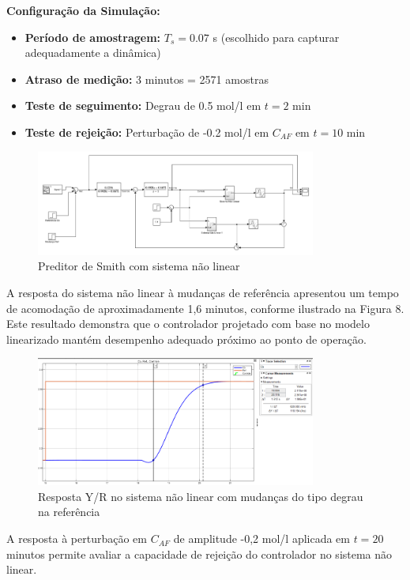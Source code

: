 \documentclass[a4paper,12pt]{article}
\begin{document}
\textbf{Configuração da Simulação:}
\begin{itemize}
\item \textbf{Período de amostragem:} $T_s = 0.07$ s (escolhido para capturar adequadamente a dinâmica)
\item \textbf{Atraso de medição:} 3 minutos = 2571 amostras
\item \textbf{Teste de seguimento:} Degrau de 0.5 mol/l em $t = 2$ min
\item \textbf{Teste de rejeição:} Perturbação de -0.2 mol/l em $C_{AF}$ em $t = 10$ min
\end{itemize}

\begin{figure}[H]
  \centering
  \includegraphics[width=0.82\textwidth]{figure5.png}
  \caption{Preditor de Smith com sistema não linear}
  \end{figure}

A resposta do sistema não linear à mudanças de referência apresentou um tempo de acomodação de aproximadamente 1,6 minutos, conforme ilustrado na Figura 8. Este resultado demonstra que o controlador projetado com base no modelo linearizado mantém desempenho adequado próximo ao ponto de operação.

\begin{figure}[H]
  \centering
  \includegraphics[width=0.82\textwidth]{figure6.png}
  \caption{Resposta Y/R no sistema não linear com mudanças do tipo degrau na referência}
  \end{figure}

A resposta à perturbação em $C_{AF}$ de amplitude -0,2 mol/l aplicada em $t = 20$ minutos permite avaliar a capacidade de rejeição do controlador no sistema não linear.
\end{document}
